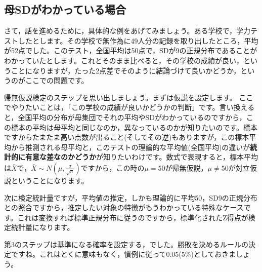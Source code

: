 \documentclass{ltjsbook}
\begin{document}
\subsection{母SDがわかっている場合}

さて，話を進めるために，具体的な例をあげてみましょう。ある学校で，学力テストしたとします。その学校で無作為に49人分の記録を取り出したところ，平均が52点でした。このテスト，全国平均は50点で，SDが9の正規分布であることがわかっていたとします。これとそのまま比べると，その学校の成績が良い，ということになりますが，たった2点差でそのように結論づけて良いかどうか，というのがここでの問題です。

帰無仮説検定のステップを思い出しましょう。まずは仮説を設定します。
ここでやりたいことは，「この学校の成績が良いかどうかの判断」です。言い換えると，全国平均の分布が母集団でそれの平均やSDがわかっているのですから，この標本の平均は母平均と同じなのか，異なっているのかが知りたいのです。標本ですからたまたま高い点数が出ること(そしてその逆)もありますが，この標本平均から推測される母平均と，このテストの理論的な平均値(全国平均)の違いが\textbf{統計的に有意な差なのかどうか}が知りたいわけです。数式で表現すると，標本平均は$\bar{X}$で，$\bar{X} \sim N(\mu, \frac{\sigma}{\sqrt{n}})$ですから，この時の$\mu=50$が帰無仮説，$\mu \neq 50$が対立仮説ということになります。

次に検定統計量ですが，平均値の推定，しかも理論的に平均50，SD9の正規分布との照合ですから，推定したい対象の特徴がもうわかっている特殊なケースです。これは変換すれば標準正規分布に従うのですから，標準化されたZ得点が検定統計量になります。

第3のステップは基準になる確率を設定する，でした。勝敗を決めるルールの決定ですね。これはとくに意味もなく，慣例に従って0.05(5\%)としておきましょう。
\end{document}
